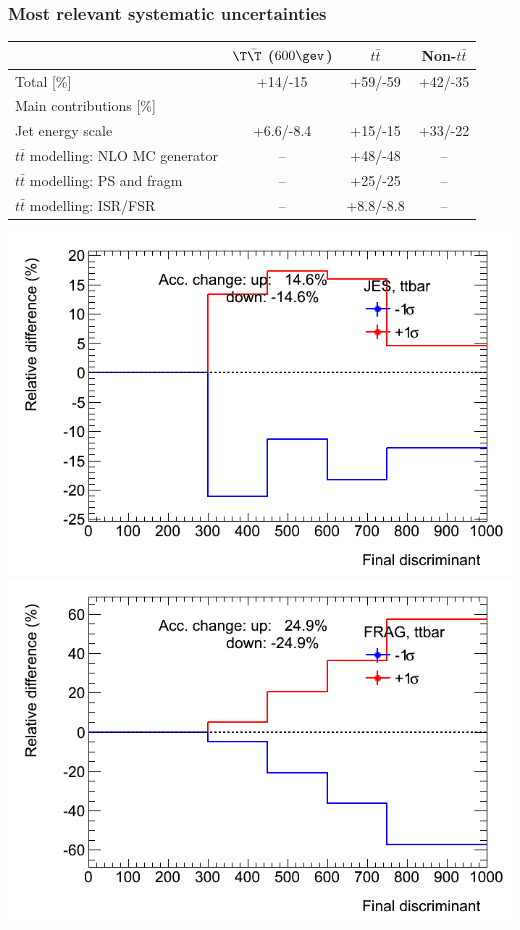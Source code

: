 \begin{frame}\frametitle{Most relevant systematic uncertainties}
\centering\footnotesize

\begin{tabular}{l*{3}{c}}
\toprule
 & $\T\bar{\T}$ ($600\gev$) & $t\bar{t}$ & Non-$t\bar{t}$\\
\midrule
Total [\%] & +14/-15 & +59/-59 & +42/-35\\
\midrule
Main contributions [\%] &&&\\
Jet energy scale & +6.6/-8.4 & +15/-15 & +33/-22\\  
$t\bar{t}$ modelling: NLO MC generator & -- & +48/-48 & --\\  
$t\bar{t}$ modelling: PS and fragm & -- & +25/-25 & --\\  
$t\bar{t}$ modelling: ISR/FSR & -- & +8.8/-8.8 & --\\   
\bottomrule
\end{tabular}

\includegraphics[width=.4\textwidth]{pics/ELEMUON_tight_Bin1_ttbar_JES.png}
\includegraphics[width=.4\textwidth]{pics/ELEMUON_tight_Bin1_ttbar_FRAG.png}


\end{frame}


